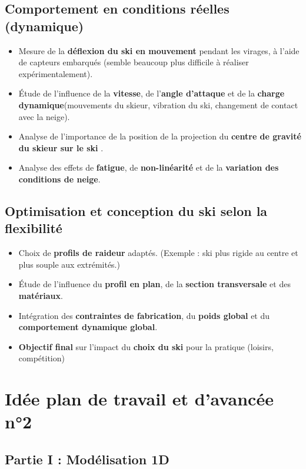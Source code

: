\documentclass[12pt, a4paper]{article}
\begin{document}
\subsection{Comportement en conditions réelles (dynamique)}

\begin{itemize}
  \item Mesure de la \textbf{déflexion du ski en mouvement} pendant les virages, à l’aide de capteurs embarqués (semble beaucoup plus difficile à réaliser expérimentalement).
  \item Étude de l’influence de la \textbf{vitesse}, de l’\textbf{angle d’attaque} et de la \textbf{charge dynamique}(mouvements du skieur, vibration du ski, changement de contact avec la neige).
  \item Analyse de l'importance de la position de la projection du \textbf{centre de gravité du skieur sur le ski} .
  \item Analyse des effets de \textbf{fatigue}, de \textbf{non-linéarité} et de la \textbf{variation des conditions de neige}.
\end{itemize}

\subsection{Optimisation et conception du ski selon la flexibilité}

\begin{itemize}
  \item Choix de \textbf{profils de raideur} adaptés. (Exemple : ski plus rigide au centre et plus souple aux extrémités.)
  \item Étude de l’influence du \textbf{profil en plan}, de la \textbf{section transversale} et des \textbf{matériaux}.
  \item Intégration des \textbf{contraintes de fabrication}, du \textbf{poids global} et du \textbf{comportement dynamique global}.
  \item \textbf{Objectif final} sur l'impact du \textbf{choix du ski }pour la pratique (loisirs, compétition)
\end{itemize}

\section{Idée plan de travail et d'avancée n°2}

\subsection{Partie I : Modélisation 1D}
\end{document}

